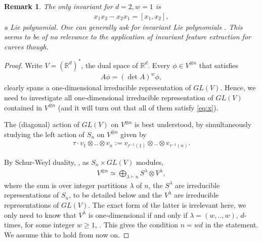 \documentclass{scrartcl}
\theoremstyle{plain}
\newtheorem{remark}[theorem]{Remark}
\theoremstyle{definition}
\newcommand{\R}{\mathbb{R}}
\newcommand{\1}[1]{1_{\{#1\}}}
\newcommand{\ds}{d} %
\begin{document}
\begin{remark}
  The only invariant for $d=2, w=1$ is
  \begin{align*}
    x_1 x_2 - x_2 x_1 = [x_1,x_2],
  \end{align*}
  a Lie polynomial.
  One can generally ask for invariant Lie polynomials \cite[Section 8.6.2]{bib:Reu1993}.
  This seems to be of no relevance to the application of invariant feature extraction for curves though.
\end{remark}

\begin{proof}
  Write $V = (\R^\ds)^*$, the dual space of $\R^\ds$.
  Every $\phi \in V^{\otimes n}$ that satisfies
  \begin{align}
    \label{eq:x}
    A \phi = (\det A)^w \phi,
  \end{align}
  clearly spans a one-dimensional irreducible representation of $GL(V)$.
  Hence, we need to investigate all one-dimensional irreducible representation 
  of $GL(V)$ contained in $V^{\otimes n}$ (and it will turn out that all of them satisfy \eqref{eq:x}).

  The (diagonal) action of $GL(V)$ on $V^{\otimes n}$ is best understood,
  by simultaneously studying the left action of $S_n$ on $V^{\otimes n}$ given
  by
  \begin{align*}
    \tau \cdot v_1 \otimes .. \otimes v_n
    :=
    v_{\tau^{-1}(1)} \otimes .. \otimes v_{\tau^{-1}(n)}.
  \end{align*}


  By Schur-Weyl duality, \cite[Theorem 6.4.5.2]{bib:Lan2012}, as $S_n \times GL(V)$ modules,
  \begin{align}
    \label{eq:schurWeyl}
    V^{\otimes n} \simeq \bigoplus_{\lambda \vdash n} S^\lambda \otimes V^\lambda,
  \end{align}
  where the sum is over integer partitions $\lambda$ of $n$,
  the $S^\lambda$ are irreducible representations of $S_n$, to be detailed below
  and the $V^\lambda$ are irreducible representations of $GL(V)$.
  The exact form of the latter is irrelevant here,
  we only need to know that $V^\lambda$ is one-dimensional if
  and only if $\lambda = (w,..,w)$, $d$-times, for some integer $w \ge 1$,
  \cite[p.21]{bib:DC1970}.
  This gives the condition $n = w d$ in the statement. We assume this to hold from now on.


\end{proof}
\end{document}
